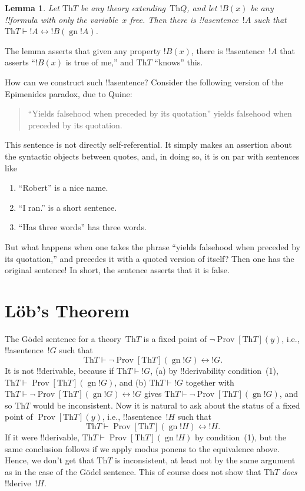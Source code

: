 \documentclass[10pt,a4paper]{article}
\theoremstyle{plain}
\newtheorem{lem}[thm]{Lemma}
\theoremstyle{definition}
\theoremstyle{remark}
\newcommand*{\olfileid}[3]{}
\newcommand*{\olsection}[1]{\section*{#1}}
\providecommand{\Proves}{\mathrel{\vdash}}
\providecommand{\Th}{\ensuremath{\mathrm{Th}}}
\providecommand{\gn}{\operatorname{gn}}
\providecommand{\liff}{\mathbin{\leftrightarrow}}
\providecommand{\OProv}{\operatorname{Prov}}
\begin{document}
\begin{lem}
Let $\Th{T}$ be any theory extending~$\Th{Q}$, and let $!B(x)$ be any
!!{formula} with only the variable~$x$ free. Then there is
!!a{sentence}~$!A$ such that $\Th{T} \Proves!A \liff !B(\gn{!A})$.
\end{lem}

The lemma asserts that given any property $!B(x)$, there is
!!a{sentence}~$!A$ that asserts ``$!B(x)$ is true of me,'' and
$\Th{T}$ ``knows'' this.

How can we construct such !!a{sentence}? Consider the following version
of the Epimenides paradox, due to Quine:
\begin{quote}
``Yields falsehood when preceded by its quotation'' yields falsehood
when preceded by its quotation.
\end{quote}
This sentence is not directly self-referential. It simply makes an
assertion about the syntactic objects between quotes, and, in doing
so, it is on par with sentences like
\begin{enumerate}
\item ``Robert'' is a nice name.
\item ``I ran.'' is a short sentence.
\item ``Has three words'' has three words.
\end{enumerate}
But what happens when one takes the phrase ``yields falsehood when
preceded by its quotation,'' and precedes it with a quoted version of
itself? Then one has the original sentence!{} In short, the sentence
asserts that it is false.





\olfileid{inc}{inp}{lob}

\olsection{L\"ob's Theorem}

The G\"odel sentence for a theory~$\Th{T}$ is a fixed point of $\lnot
\OProv[\Th{T}](y)$, i.e., !!a{sentence}~$!G$ such that
\[
\Th{T} \Proves \lnot \OProv[\Th{T}](\gn{!G}) \liff !G.
\]
It is not !!{derivable}, because if $\Th{T} \Proves !G$, (a) by !!{derivability}
condition~(1), $\Th{T} \Proves \OProv[\Th{T}](\gn{!G})$, and (b) $\Th{T}
\Proves !G$ together with $\Th{T} \Proves \lnot \OProv[\Th{T}](\gn{!G})
\liff !G$ gives $\Th{T} \Proves \lnot \OProv[\Th{T}](\gn{!G})$, and so
$\Th{T}$ would be inconsistent.  Now it is natural to ask about the
status of a fixed point of $\OProv[\Th{T}](y)$, i.e., !!a{sentence}~$!H$
such that
\[
\Th{T} \Proves \OProv[\Th{T}](\gn{!H}) \liff !H.
\]
If it were !!{derivable}, $\Th{T} \Proves \OProv[\Th{T}](\gn{!H})$ by
condition~(1), but the same conclusion follows if we apply modus
ponens to the equivalence above. Hence, we don't get that $\Th{T}$ is
inconsistent, at least not by the same argument as in the case of the
G\"odel sentence. This of course does not show that $\Th{T}$
\emph{does} !!{derive}~$!H$.
\end{document}
